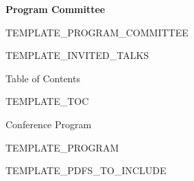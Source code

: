 \documentclass[10pt]{article}
\begin{document}
\begin{center}
\textbf{Program Committee}
\end{center}
TEMPLATE_PROGRAM_COMMITTEE
\newpage

TEMPLATE_INVITED_TALKS

\pagestyle{plain}
\begin{center}
Table of Contents
\end{center}
\newcommand\page[1]{\rightskip=25pt \dotfill\rlap{\hbox to 25pt{\hfill#1}}\par}
\begin{itemize}[leftmargin=*,label={}]
TEMPLATE_TOC
\end{itemize}
\newpage

\begin{center}
  Conference Program
\end{center}
TEMPLATE_PROGRAM
\newpage
\setcounter{page}{1}

TEMPLATE_PDFS_TO_INCLUDE
\end{document}

